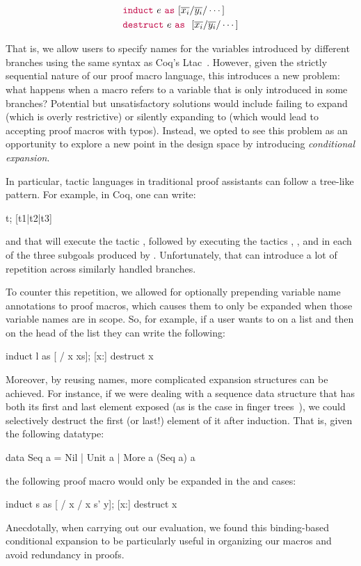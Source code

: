 \begin{align*}
  & {\color{purple}\mathtt{induct}} ~ e ~ {\color{purple}\mathtt{as}} ~ \mathtt{[} \overline{x_i} / \overline{y_i} / \cdots \mathtt{]}\\
  & {\color{purple}\mathtt{destruct}} ~ e ~ {\color{purple}\mathtt{as}} ~ ~ \mathtt{[} \overline{x_i} / \overline{y_i} / \cdots \mathtt{]}
\end{align*}

That is, we allow users to specify names for the variables introduced
by different branches using the same syntax as Coq's
Ltac~\cite{Ltac}. However, given the strictly sequential nature of our
proof macro language, this introduces a new problem: what happens when
a macro refers to a variable that is only introduced in some branches?
Potential but unsatisfactory solutions would include failing to expand
(which is overly restrictive) or silently expanding to 
(which would lead to accepting proof macros with typos). Instead, we
opted to see this problem as an opportunity to explore a new point in
the design space by introducing {\em conditional expansion}.

In particular, tactic languages in traditional proof assistants can
follow a tree-like pattern. For example, in Coq, one can write:
\begin{code}
  t; [t1|t2|t3]
\end{code}
and that will execute the tactic , followed by executing the
tactics , , and  in each of the three subgoals
produced by . Unfortunately, that can introduce a lot of
repetition across similarly handled branches.

To counter this repetition, we allowed for optionally pre\-pending
variable name annotations to proof macros, which causes them to only
be expanded when those variable names are in scope. So, for example,
if a user wants to  on a list  and then
 on the head of the list they can write the following:
\begin{code}
  induct l as [ / x xs];
  [x:] destruct x
\end{code}
%
Moreover, by reusing names, more complicated expansion structures can
be achieved. For instance, if we were dealing with a sequence data
structure that has both its first and last element exposed (as is the
case in finger trees~\cite{FingerTrees}), we could selectively destruct
the first (or last!) element of it after induction. That is, given the
following  datatype:
%
\begin{code}
  data Seq a = Nil | Unit a | More a (Seq a) a
\end{code}
%
the following proof macro would only be expanded in the  and
 cases:
\begin{code}
  induct s as [ / x / x s' y];
  [x:] destruct x
\end{code}
%
Anecdotally, when carrying out our evaluation, we found this
binding-based conditional expansion to be particularly useful in
organizing our macros and avoid redundancy in proofs.

